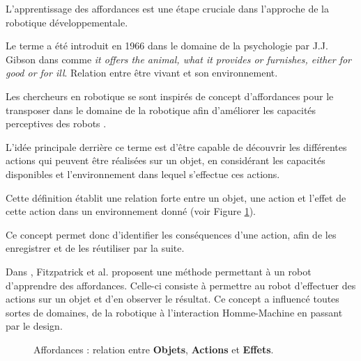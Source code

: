 \documentclass[draft]{llncs}
\begin{document}
L'apprentissage des affordances est une étape cruciale dans l'approche de la robotique développementale.

Le terme a été introduit en 1966 dans le domaine de la psychologie par J.J. Gibson dans \cite{opac-b1085639} comme \textit{it offers the animal, what it provides or furnishes, either for good or for ill}.
Relation entre être vivant et son environnement.

Les chercheurs en robotique se sont inspirés de concept d'affordances pour le transposer dans le domaine de la robotique afin d'améliorer les capacités perceptives des robots \cite{Jamone2016}.

L'idée principale derrière ce terme est d'être capable de découvrir les différentes actions qui peuvent être réalisées sur un objet, en considérant les capacités disponibles et l'environnement dans lequel s'effectue ces actions.

Cette définition établit une relation forte entre un objet, une action et l'effet de cette action dans un environnement donné (voir Figure \ref{fig:affordances}).

Ce concept permet donc d'identifier les conséquences d'une action, afin de les enregistrer et de les réutiliser par la suite.

Dans \cite{Fitzpatrick2003}, Fitzpatrick et al. proposent une méthode permettant à un robot d'apprendre des affordances. Celle-ci consiste à permettre au robot d'effectuer des actions sur un objet et d'en observer le résultat.
Ce concept a influencé toutes sortes de domaines, de la robotique à l'interaction Homme-Machine en passant par le design.

\begin{figure}
  \centering

  \label{fig:affordances}
	\caption{Affordances : relation entre \textbf{Objets}, \textbf{Actions} et \textbf{Effets}.}

\end{figure}
\end{document}
